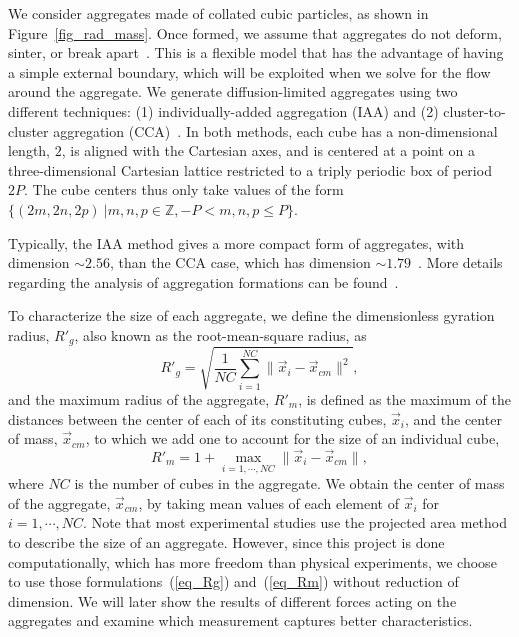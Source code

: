 We consider aggregates made of collated cubic particles, as shown in Figure~\ref{fig_rad_mass}. Once formed, we assume that aggregates do not deform, sinter, or break apart~\cite{eggersdorfer_multiparticle_2011}.
This is a flexible model that has the advantage of having a
simple external boundary, which will be exploited when we solve for the flow around the aggregate. We generate diffusion-limited aggregates using two different techniques: (1)
individually-added aggregation (IAA) and (2) cluster-to-cluster aggregation (CCA)~\cite{witten_tenuous_1986,kolb_anisotropic_1987}. In both methods, each cube has a non-dimensional length, $2$, is aligned with the Cartesian axes, and is centered at a point on a three-dimensional Cartesian lattice restricted to a triply periodic box of period $2P$. The cube centers thus only take values of the form $\{ (2m,2n,2p) \  | m,n,p \in \mathbb{Z}, -P<m,n,p\leq P \}$. 


Typically, the IAA method gives a more compact form of aggregates, with dimension $\sim 2.56$, than the CCA case, which has dimension $\sim 1.79$~\cite{witten_diffusion-limited_1981, kaye_random_2008}. More details regarding the analysis of aggregation formations can be found~\cite{yoo_hydrodynamic_2020}.


\par 
To characterize the size of each aggregate, we define the dimensionless gyration radius, $R'_g$, also known as the root-mean-square radius, as
\begin{equation}
{R'}_g  = \sqrt{\frac{1}{NC} \sum_{i=1}^{NC} \| \vec{x}_i - \vec{x}_{cm} \|^2},
\label{eq_Rg}
\end{equation}
and the maximum radius of the aggregate, $R'_m$, is defined as the
maximum of the distances between the center of each of its constituting cubes, $\vec{x}_i$, and the center of
mass, $\vec{x}_{cm}$, to which we add one to account for the size of an individual cube,
\begin{equation}
{R'}_m = 1+ \max_{i = 1, \cdots, NC} \| \vec{x}_i - \vec{x}_{cm} \|,
\label{eq_Rm}
\end{equation}
where $NC$ is the number of cubes in the aggregate.
We obtain the center of mass of the aggregate, $\vec{x}_{cm}$, by taking mean values of each element of $\vec{x}_i$ for $i = 1, \cdots, NC$.
Note that most experimental studies use the projected area method to describe the size of an aggregate. However, since this project is done computationally, which has more freedom than physical experiments, we choose to use those formulations~(\ref{eq_Rg}) and~(\ref{eq_Rm}) without reduction of dimension.
We will later show the results of different forces acting on the aggregates and examine which measurement captures better characteristics.

